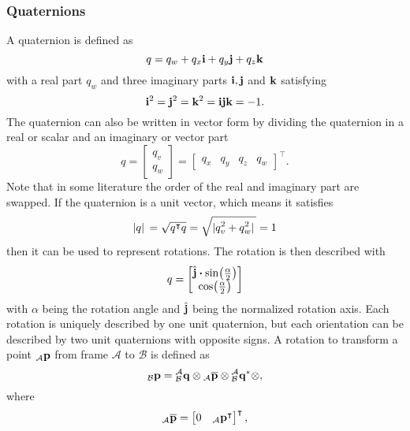 \subsubsection{Quaternions}
A quaternion is defined as
\begin{equation}
    q = q_w + q_x\vb{i} + q_y\vb{j} + q_z\vb{k}
\end{equation}
with a real part $q_w$ and three imaginary parts $\vb{i}, \vb{j}$ and $\vb{k}$ satisfying
\begin{equation}
    \vb{i}^2 = \vb{j}^2 = \vb{k}^2 = \vb{i}\vb{j}\vb{k} = -1.
\end{equation}
The quaternion can also be written in vector form by dividing the quaternion in a real or scalar and an imaginary or vector part
\begin{equation}
    q = \begin{bmatrix}
        q_v \\
        q_w
    \end{bmatrix}
    =\begin{bmatrix}
        q_x & q_y & q_z & q_w
    \end{bmatrix}^\intercal.
\end{equation}
Note that in some literature the order of the real and imaginary part are swapped.
If the quaternion is a unit vector, which means it satisfies
\begin{equation}
    \abs*{q} = \sqrt{q^\intercal q} = \sqrt{\abs*{q_v^2 + q_w^2}} = 1
\end{equation}
then it can be used to represent rotations.
The rotation is then described with
\begin{equation}
    q =
    \begin{bmatrix}
        \hat{\vb{j}}\vdot\sin(\frac{\alpha}{2}) \\
        \cos(\frac{\alpha}{2})
    \end{bmatrix}
\end{equation}
with $\alpha$ being the rotation angle and $\hat{\vb{j}}$ being the normalized rotation axis.
Each rotation is uniquely described by one unit quaternion, but each orientation can be described by two unit quaternions with opposite signs.
A rotation to transform a point ${}_\mathcal{A}\vb{p}$ from frame $\mathcal{A}$ to $\mathcal{B}$ is defined as
\begin{equation}
    {}_\mathcal{B}\vb{p} = \qtf{a}{b} \otimes {}_\mathcal{A}\overline{\vb{p}} \otimes \qtf{a}{b}^* \otimes,
\end{equation}
where
\begin{equation}
    {}_\mathcal{A}\overline{\vb{p}} = \begin{bmatrix}
        0 & {}_\mathcal{A}\vb{p}^\intercal
    \end{bmatrix}^\intercal,
\end{equation}
